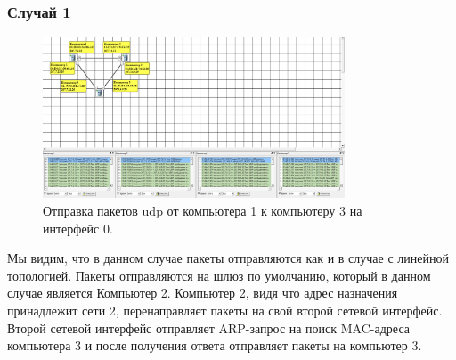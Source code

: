 \documentclass[12pt,onecolumn]{article}
\begin{document}
\subsubsection{Случай 1}
\begin{figure}[H]
  \centering
  \includegraphics[width=0.8\textwidth]{image/part3/udp-1.png}
  \caption{Отправка пакетов udp от компьютера 1 к компьютеру 3 на интерфейс 0.}
\end{figure}
Мы видим, что в данном случае пакеты отправляются как и в случае с линейной топологией. Пакеты отправляются на шлюз по умолчанию, который в данном случае является Компьютер 2. Компьютер 2, видя что адрес назначения принадлежит сети 2, перенаправляет пакеты на свой второй сетевой интерфейс. Второй сетевой интерфейс отправляет ARP-запрос на поиск MAC-адреса компьютера 3 и после получения ответа отправляет пакеты на компьютер 3.
\end{document}
